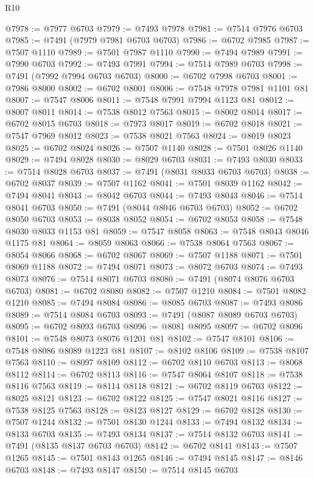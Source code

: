\begin{lexlean}{R10}
\begin{coremodule}
{{{{{{{{{{{{{{{{{{{{{{{{{{{{{{{{{{{{{{{{{{{{{{{{{{{{{{{{{{{{{{{{{{{{{{{{{{{{{{{{{{{{@7978 := @7977 @6703
@7979 := @7493 @7978
@7981 := @7514 @7976 @6703
@7985 := @7491 (@7979 @7981 @6703 @6703)
@7986 := @6702 @7985
@7987 := @7507 @1110
@7989 := @7501 @7987 @1110
@7990 := @7494 @7989
@7991 := @7990 @6703
@7992 := @7493 @7991
@7994 := @7514 @7989 @6703
@7998 := @7491 (@7992 @7994 @6703 @6703)
@8000 := @6702 @7998 @6703
@8001 := @7986 @8000
@8002 := @6702 @8001
@8006 := @7548 @7978 @7981 @1101 @81
@8007 := @7547 @8006
@8011 := @7548 @7991 @7994 @1123 @81
@8012 := @8007 @8011
@8014 := @7538 @8012 @7563
@8015 := @8002 @8014
@8017 := @6702 @8015 @6703
@8018 := @7973 @8017
@8019 := @6702 @8018
@8021 := @7547 @7969 @8012
@8023 := @7538 @8021 @7563
@8024 := @8019 @8023
@8025 := @6702 @8024
@8026 := @7507 @1140
@8028 := @7501 @8026 @1140
@8029 := @7494 @8028
@8030 := @8029 @6703
@8031 := @7493 @8030
@8033 := @7514 @8028 @6703
@8037 := @7491 (@8031 @8033 @6703 @6703)
@8038 := @6702 @8037
@8039 := @7507 @1162
@8041 := @7501 @8039 @1162
@8042 := @7494 @8041
@8043 := @8042 @6703
@8044 := @7493 @8043
@8046 := @7514 @8041 @6703
@8050 := @7491 (@8044 @8046 @6703 @6703)
@8052 := @6702 @8050 @6703
@8053 := @8038 @8052
@8054 := @6702 @8053
@8058 := @7548 @8030 @8033 @1153 @81
@8059 := @7547 @8058
@8063 := @7548 @8043 @8046 @1175 @81
@8064 := @8059 @8063
@8066 := @7538 @8064 @7563
@8067 := @8054 @8066
@8068 := @6702 @8067
@8069 := @7507 @1188
@8071 := @7501 @8069 @1188
@8072 := @7494 @8071
@8073 := @8072 @6703
@8074 := @7493 @8073
@8076 := @7514 @8071 @6703
@8080 := @7491 (@8074 @8076 @6703 @6703)
@8081 := @6702 @8080
@8082 := @7507 @1210
@8084 := @7501 @8082 @1210
@8085 := @7494 @8084
@8086 := @8085 @6703
@8087 := @7493 @8086
@8089 := @7514 @8084 @6703
@8093 := @7491 (@8087 @8089 @6703 @6703)
@8095 := @6702 @8093 @6703
@8096 := @8081 @8095
@8097 := @6702 @8096
@8101 := @7548 @8073 @8076 @1201 @81
@8102 := @7547 @8101
@8106 := @7548 @8086 @8089 @1223 @81
@8107 := @8102 @8106
@8109 := @7538 @8107 @7563
@8110 := @8097 @8109
@8112 := @6702 @8110 @6703
@8113 := @8068 @8112
@8114 := @6702 @8113
@8116 := @7547 @8064 @8107
@8118 := @7538 @8116 @7563
@8119 := @8114 @8118
@8121 := @6702 @8119 @6703
@8122 := @8025 @8121
@8123 := @6702 @8122
@8125 := @7547 @8021 @8116
@8127 := @7538 @8125 @7563
@8128 := @8123 @8127
@8129 := @6702 @8128
@8130 := @7507 @1244
@8132 := @7501 @8130 @1244
@8133 := @7494 @8132
@8134 := @8133 @6703
@8135 := @7493 @8134
@8137 := @7514 @8132 @6703
@8141 := @7491 (@8135 @8137 @6703 @6703)
@8142 := @6702 @8141
@8143 := @7507 @1265
@8145 := @7501 @8143 @1265
@8146 := @7494 @8145
@8147 := @8146 @6703
@8148 := @7493 @8147
@8150 := @7514 @8145 @6703
}}}}}}}}}}}}}}}}}}}}}}}}}}}}}}}}}}}}}}}}}}}}}}}}}}}}}}}}}}}}}}}}}}}}}}}}}}}}}}}}}}}}
\end{coremodule}
\end{lexlean}

